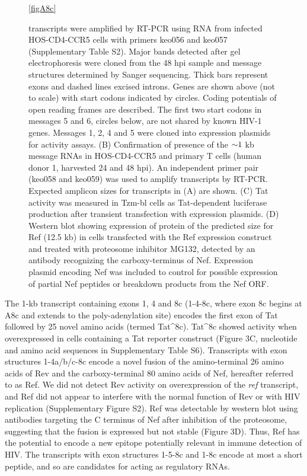 \documentclass[../sherrill-Mix_thesis.tex]{subfiles}
\begin{document}
\begin{figure}
	\centering
	\caption[Novel transcripts utilizing acceptor A8c]{\hivEight{} transcripts were amplified by RT-PCR using RNA from infected HOS-CD4-CCR5 cells with primers keo056 and keo057 (Supplementary Table S2). Major bands detected after gel electrophoresis were cloned from the 48 hpi sample and message structures determined by Sanger sequencing. Thick bars represent exons and dashed lines excised introns. Genes are shown above (not to scale) with start codons indicated by circles. Coding potentials of open reading frames are described. The first two start codons in messages 5 and 6, circles below, are not shared by known HIV-1 genes. Messages 1, 2, 4 and 5 were cloned into expression plasmids for activity assays. (B) Confirmation of presence of the $\mathord{\sim}{}1$ kb message RNAs in HOS-CD4-CCR5 and primary \cdFour{} T cells (human donor 1, harvested 24 and 48 hpi). An independent primer pair (keo058 and keo059) was used to amplify transcripts by RT-PCR. Expected amplicon sizes for transcripts in (A) are shown. (C) Tat activity was measured in Tzm-bl cells as Tat-dependent luciferase production after transient transfection with expression plasmids. (D) Western blot showing expression of protein of the predicted size for Ref (12.5 kb) in cells transfected with the Ref expression construct and treated with proteosome inhibitor MG132, detected by an antibody recognizing the carboxy-terminus of Nef. Expression plasmid encoding Nef was included to control for possible expression of partial Nef peptides or breakdown products from the Nef ORF.}
	\ref{figA8c}
\end{figure}

The 1-kb transcript containing exons 1, 4 and 8c (1-4-8c, where exon 8c begins at A8c and extends to the poly-adenylation site) encodes the first exon of Tat followed by 25 novel amino acids (termed Tat\^{}8c). Tat\^{}8c showed activity when overexpressed in cells containing a Tat reporter construct (Figure 3C, nucleotide and amino acid sequences in Supplementary Table S6). Transcripts with exon structures 1-4a/b/c-8c encode a novel fusion of the amino-terminal 26 amino acids of Rev and the carboxy-terminal 80 amino acids of Nef, hereafter referred to as Ref. We did not detect Rev activity on overexpression of the \textit{ref} transcript, and Ref did not appear to interfere with the normal function of Rev or with HIV replication (Supplementary Figure S2). Ref was detectable by western blot using antibodies targeting the C terminus of Nef after inhibition of the proteosome, suggesting that the fusion is expressed but not stable (Figure 3D). Thus, Ref has the potential to encode a new epitope potentially relevant in immune detection of HIV. The transcripts with exon structures 1-5-8c and 1-8c encode at most a short peptide, and so are candidates for acting as regulatory RNAs.
\end{document}
